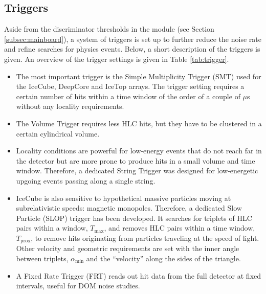 \subsection{Triggers}
\label{subsec:triggers}
Aside from the discriminator thresholds in the module (see Section \ref{subsec:mainboard}), a system of triggers is set up to further reduce the noise rate and refine searches for physics events. Below, a short description of the triggers is given. An overview of the trigger settings is given in Table \ref{tab:trigger}. 

\vspace{2mm}
\begin{itemize}
\item The most important trigger is the Simple Multiplicity Trigger (SMT) used for the IceCube, DeepCore and IceTop arrays. The trigger setting requires a certain number of hits within a time window of the order of a couple of $\mu$s without any locality requirements.
\item The Volume Trigger requires less HLC hits, but they have to be clustered in a certain cylindrical volume. 
\item Locality conditions are powerful for low-energy events that do not reach far in the detector but are more prone to produce hits in a small volume and time window. Therefore, a dedicated String Trigger was designed for low-energetic upgoing events passing along a single string. 
\item IceCube is also sensitive to hypothetical massive particles moving at subrelativistic speeds: magnetic monopoles. Therefore, a dedicated Slow Particle (SLOP) trigger has been developed. It searches for triplets of HLC pairs within a window, $T_{\textrm{max}}$, and removes HLC pairs within a time window, $T_{\textrm{prox}}$, to remove hits originating from particles traveling at the speed of light. Other velocity and geometric requirements are set with the inner angle between triplets, $\alpha_{\textrm{min}}$ and the ``velocity'' along the sides of the triangle.
\item A Fixed Rate Trigger (FRT) reads out hit data from the full detector at fixed intervals, useful for DOM noise studies.
\end{itemize}
\vspace{2mm}


